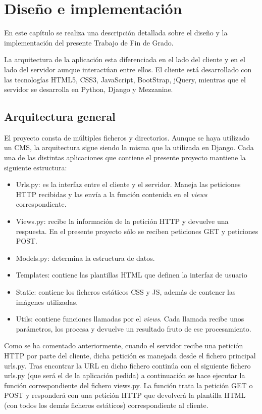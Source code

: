 \cleardoublepage
\chapter{Diseño e implementación}
\label{chap:design_implement}



En este capítulo se realiza una descripción detallada sobre el diseño y la implementación del presente Trabajo de Fin de Grado.


La arquitectura de la aplicación esta diferenciada en el lado del cliente y en el lado del servidor aunque interactúan entre ellos. El cliente está desarrollado con las tecnologías HTML5, CSS3, JavaScript, BootStrap, jQuery, mientras que el servidor se desarrolla en Python, Django y Mezzanine.



\section{Arquitectura general} 
\label{sec:arquitectura}

El proyecto consta de múltiples ficheros y directorios. Aunque se haya utilizado un CMS, la arquitectura sigue siendo la misma que la utilizada en Django. Cada una de las distintas aplicaciones que contiene el presente proyecto mantiene la siguiente estructura:
\begin{itemize}
	\item Urls.py: es la interfaz entre el cliente y el servidor. Maneja las peticiones HTTP recibidas y las envía a la función contenida en el \textit{views} correspondiente.
	\item Views.py: recibe la información de la petición HTTP y devuelve una respuesta. En el presente proyecto sólo se reciben peticiones GET y peticiones POST.
	\item Models.py: determina la estructura de datos.
	\item Templates: contiene las plantillas HTML que definen la interfaz de usuario
	\item Static: contiene los ficheros estáticos CSS y JS, además de contener las imágenes utilizadas.
	\item Utils: contiene funciones llamadas por el \textit{views}. Cada llamada recibe unos parámetros, los procesa y devuelve un resultado fruto de ese procesamiento.
\end{itemize}
Como se ha comentado anteriormente, cuando el servidor recibe una petición HTTP por parte del cliente, dicha petición es manejada desde el fichero principal urls.py. Tras encontrar la URL en dicho fichero continúa con el siguiente fichero urls.py (que será el de la aplicación pedida) a continuación se hace ejecutar la función correspondiente del fichero views.py. La función trata la petición GET o POST y responderá con una petición HTTP que devolverá la plantilla HTML (con todos los demás ficheros estáticos) correspondiente al cliente.

